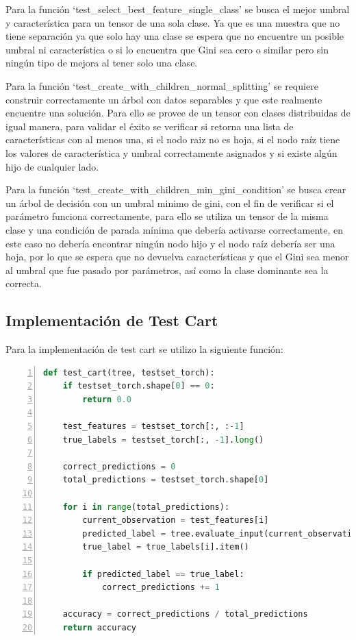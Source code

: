 \documentclass[12pt,a4paper]{article}
\begin{document}
Para la función `test_select_best_feature_single_class' se busca el mejor umbral y característica para un tensor de una sola clase.
Ya que es una muestra que no tiene separación ya que solo hay una clase se espera que no encuentre un posible umbral ni característica
o si lo encuentra que Gini sea cero o similar pero sin ningún tipo de mejora al tener solo una clase.

Para la función `test_create_with_children_normal_splitting' se requiere construir correctamente un árbol con datos separables
y que este realmente encuentre una solución.
Para ello se provee de un tensor con clases distribuidas de igual manera, para validar
el éxito se verificar si retorna una lista de características con al menos una, si el nodo raiz no es hoja,
si el nodo raíz tiene los valores de característica y umbral correctamente asignados y si existe algún hijo
de cualquier lado.

Para la función `test_create_with_children_min_gini_condition'
se busca crear un árbol de decisión
con un umbral minimo de gini, con el fin
de verificar si el parámetro funciona correctamente, para ello se utiliza un tensor de la misma clase y una condición de parada mínima
que debería activarse correctamente, en este caso no debería encontrar ningún nodo hijo y el nodo raíz debería ser una hoja,
por lo que se espera que no devuelva características y que el Gini sea menor al umbral que fue pasado por parámetros, así como
la clase dominante sea la correcta.

\subsection{Implementación de Test Cart}\label{subsec:implementacion-de-test-cart}

Para la implementación de test cart se utilizo la siguiente función:

    \begin{lstlisting}[language=Python, numbers=left, basicstyle=\ttfamily\small,label={lst:lstlisting9}]
  def test_cart(tree, testset_torch):
    if testset_torch.shape[0] == 0:
        return 0.0

    test_features = testset_torch[:, :-1]
    true_labels = testset_torch[:, -1].long()

    correct_predictions = 0
    total_predictions = testset_torch.shape[0]

    for i in range(total_predictions):
        current_observation = test_features[i]
        predicted_label = tree.evaluate_input(current_observation)
        true_label = true_labels[i].item()

        if predicted_label == true_label:
            correct_predictions += 1

    accuracy = correct_predictions / total_predictions
    return accuracy
    \end{lstlisting}
\end{document}
